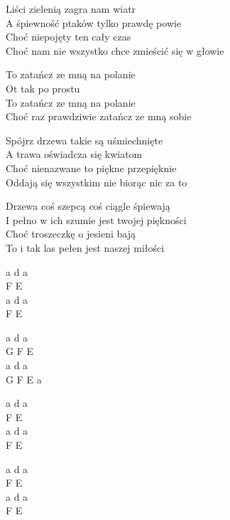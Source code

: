 \begin{text}
Liści zielenią zagra nam wiatr\\
A śpiewność ptaków tylko prawdę powie\\
Choć niepojęty ten cały czas\\
Choć nam nie wszystko chce zmieścić się w głowie

\vin To zatańcz ze mną na polanie\\
\vin Ot tak po prostu\\
\vin To zatańcz ze mną na polanie\\
\vin Choć raz prawdziwie zatańcz ze mną sobie

Spójrz drzewa takie są uśmiechnięte\\
A trawa oświadcza się kwiatom\\
Choć nienazwane to piękne przepięknie\\
Oddają się wszystkim nie biorąc nic za to

Drzewa coś szepcą coś ciągle śpiewają\\
I pełno w ich szumie jest twojej piękności\\
Choć troszeczkę o jesieni bają\\
To i tak las pełen jest naszej miłości
\end{text}
\begin{chord}
a d a\\
F E\\
a d a\\
F E

a d a\\
G F E\\
a d a\\
G F E a

a d a\\
F E\\
a d a\\
F E

a d a\\
F E\\
a d a\\
F E
\end{chord}
